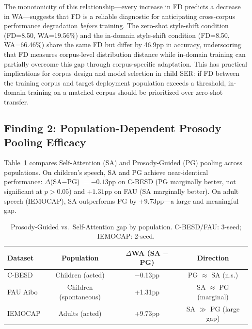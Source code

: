 \noindent The monotonicity of this relationship---every increase in FD
predicts a decrease in WA---suggests that FD is a reliable diagnostic for
anticipating cross-corpus performance degradation \textit{before} training. The
zero-shot style-shift condition (FD=8.50, WA=19.56\%) and the in-domain
style-shift condition (FD=8.50, WA=66.46\%) share the same FD but differ by
46.9pp in accuracy, underscoring that FD measures corpus-level distribution
distance while in-domain training can partially overcome this gap through
corpus-specific adaptation. This has practical implications for corpus design
and model selection in child SER: if FD between the training corpus and target
deployment population exceeds a threshold, in-domain training on a matched
corpus should be prioritized over zero-shot transfer.

\subsection{Finding 2: Population-Dependent Prosody Pooling Efficacy}

Table~\ref{tab:prosody_gap} compares Self-Attention (SA) and Prosody-Guided
(PG) pooling across populations. On children's speech, SA and PG achieve
near-identical performance: $\Delta$(SA$-$PG) $=-0.13$pp on C-BESD (PG
marginally better, not significant at $p>0.05$) and $+1.31$pp on FAU
(SA marginally better). On adult speech (IEMOCAP), SA outperforms PG by
$+9.73$pp---a large and meaningful gap.

\begin{table}[h]
\centering
\caption{Prosody-Guided vs.\ Self-Attention gap by population. C-BESD/FAU: 3-seed; IEMOCAP: 2-seed.}
\label{tab:prosody_gap}
\begin{tabular}{lccc}
\toprule
\textbf{Dataset} & \textbf{Population} & \textbf{$\Delta$WA (SA $-$ PG)} & \textbf{Direction} \\
\midrule
C-BESD & Children (acted) & $-$0.13pp & PG $\approx$ SA (n.s.) \\
FAU Aibo & Children (spontaneous) & +1.31pp & SA $\approx$ PG (marginal) \\
IEMOCAP & Adults (acted) & +9.73pp & SA $\gg$ PG (large gap) \\
\bottomrule
\end{tabular}
\end{table}

